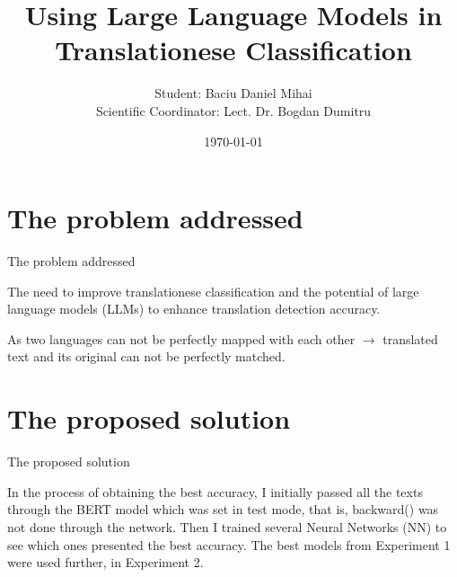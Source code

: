 \documentclass[
]{beamer}
\title[Using LLMs for Translationese]{Using Large Language Models in Translationese Classification}
\author[Dani Baciu]{Student: Baciu Daniel Mihai\texorpdfstring{\\}{, }Scientific Coordinator: Lect. Dr. Bogdan Dumitru}
\institute[UniBuc]{University of Bucharest}
\date{\today}
\begin{document}
\begin{frame}%
\maketitle
\end{frame}







\section[The problem addressed]{The problem addressed}

\begin{frame}{The problem addressed}

\hspace{0.4cm} The need to improve translationese classification and the potential of large language models (LLMs) to enhance translation detection accuracy. 
\vspace{1cm}
\begin{block}{}
As two languages can not be perfectly mapped with each other $\rightarrow$ translated text and its original can not be perfectly matched.
\end{block}

\end{frame}







\section[The proposed solution]{The proposed solution}

\begin{frame}{The proposed solution}

\hspace{0.4cm} In the process of obtaining the best accuracy, I initially passed all the texts through the BERT model which was set in test mode, that is, backward() was not done through the network. Then I trained several Neural Networks (NN) to see which ones presented the best accuracy. The best models from Experiment 1 were used further, in Experiment 2.

\end{frame}
\end{document}
